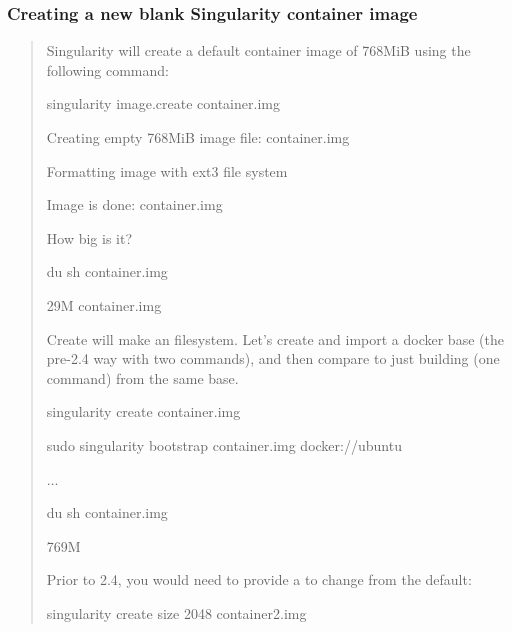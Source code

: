 \documentclass[letterpaper,10pt,english]{sphinxmanual}
\begin{document}
\subsubsection{Creating a new blank Singularity container image}
\label{\detokenize{appendix:creating-a-new-blank-singularity-container-image}}\begin{quote}

Singularity will create a default container image of 768MiB using the
following command:

%
\begin{sphinxVerbatim}[commandchars=\\\{\}]
singularity image.create container.img

Creating empty 768MiB image file: container.img

Formatting image with ext3 file system

Image is done: container.img
\end{sphinxVerbatim}

How big is it?

%
\begin{sphinxVerbatim}[commandchars=\\\{\}]
\PYGZdl{} du \PYGZhy{}sh container.img

29M     container.img
\end{sphinxVerbatim}

Create will make an  filesystem. Let’s create and import a docker base
(the pre-2.4 way with two commands), and then compare to just building
(one command) from the same base.

%
\begin{sphinxVerbatim}[commandchars=\\\{\}]
singularity create container.img

sudo singularity bootstrap container.img docker://ubuntu


...


\PYGZdl{} du \PYGZhy{}sh container.img

769M
\end{sphinxVerbatim}

Prior to 2.4, you would need to provide a  to change from the default:

%
\begin{sphinxVerbatim}[commandchars=\\\{\}]
\PYGZdl{} singularity create \PYGZhy{}\PYGZhy{}size 2048 container2.img


\end{sphinxVerbatim}
\end{quote}
\end{document}
